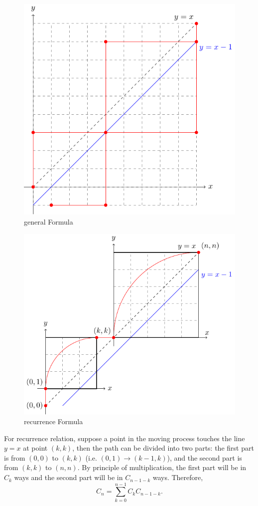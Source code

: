 \begin{multicols}{2}
    \begin{figure}[H]
        \centering
        \includegraphics[width=0.9\columnwidth]{figures/symmetry.pdf}
        \caption{general Formula}\label{fig:symmetry}
    \end{figure}
    \begin{figure}[H]
        \centering
        \includegraphics[width=\columnwidth]{figures/recurrence.pdf}
        \caption{recurrence Formula}\label{fig:recurrence}
    \end{figure}
\end{multicols}

For recurrence relation, suppose a point in the moving process touches the line $y=x$ at point $(k,k)$, then the path can be divided into two parts: the first part is from $(0,0)$ to $(k,k)$ (i.e. $(0,1)\to(k-1,k)$), and the second part is from $(k,k)$ to $(n,n)$. By principle of multiplication, the first part will be in $C_k$ ways and the second part will be in $C_{n-1-k}$ ways. Therefore,
\begin{equation}
    C_n = \sum_{k=0}^{n-1} C_kC_{n-1-k}. 
\end{equation}
